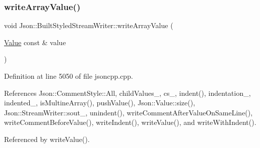 \subsubsection{\texorpdfstring{write\+Array\+Value()}{writeArrayValue()}}
{\footnotesize\ttfamily void Json\+::\+Built\+Styled\+Stream\+Writer\+::write\+Array\+Value (\begin{DoxyParamCaption}\item[{\hyperlink{class_json_1_1_value}{Value} const \&}]{value }\end{DoxyParamCaption})\hspace{0.3cm}{\ttfamily [private]}}



Definition at line 5050 of file jsoncpp.\+cpp.



References Json\+::\+Comment\+Style\+::\+All, child\+Values\+\_\+, cs\+\_\+, indent(), indentation\+\_\+, indented\+\_\+, is\+Multine\+Array(), push\+Value(), Json\+::\+Value\+::size(), Json\+::\+Stream\+Writer\+::sout\+\_\+, unindent(), write\+Comment\+After\+Value\+On\+Same\+Line(), write\+Comment\+Before\+Value(), write\+Indent(), write\+Value(), and write\+With\+Indent().



Referenced by write\+Value().


